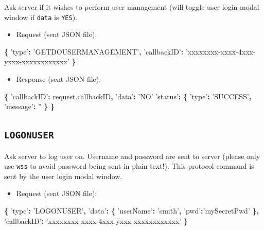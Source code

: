 \documentclass[]{book}
\newenvironment{Shaded}{\begin{snugshade}}{\end{snugshade}}
\newcommand{\AttributeTok}[1]{\textcolor[rgb]{0.77,0.63,0.00}{#1}}
\newcommand{\NormalTok}[1]{#1}
\newcommand{\OperatorTok}[1]{\textcolor[rgb]{0.81,0.36,0.00}{\textbf{#1}}}
\newcommand{\StringTok}[1]{\textcolor[rgb]{0.31,0.60,0.02}{#1}}
\newcommand{\VariableTok}[1]{\textcolor[rgb]{0.00,0.00,0.00}{#1}}
\providecommand{\tightlist}{%
  \setlength{\itemsep}{0pt}\setlength{\parskip}{0pt}}
\theoremstyle{definition}
\theoremstyle{definition}
\theoremstyle{definition}
\theoremstyle{remark}
\begin{document}
Ask server if it wishes to perform user management (will toggle user
login modal window if \texttt{data} is \texttt{YES}).

\begin{itemize}
\tightlist
\item
  Request (sent JSON file):
\end{itemize}

\begin{Shaded}
\begin{Highlighting}[]
\OperatorTok{\{}
  \StringTok{'type'}\OperatorTok{:} \StringTok{'GETDOUSERMANAGEMENT'}\OperatorTok{,}
  \StringTok{'callbackID'}\OperatorTok{:} \StringTok{'xxxxxxxx-xxxx-4xxx-yxxx-xxxxxxxxxxxx'}
\OperatorTok{\}}
\end{Highlighting}
\end{Shaded}

\begin{itemize}
\tightlist
\item
  Response (sent JSON file):
\end{itemize}

\begin{Shaded}
\begin{Highlighting}[]
\OperatorTok{\{}
  \StringTok{'callbackID'}\OperatorTok{:} \VariableTok{request}\NormalTok{.}\AttributeTok{callbackID}\OperatorTok{,}
  \StringTok{'data'}\OperatorTok{:} \StringTok{'NO'}
  \StringTok{'status'}\OperatorTok{:} \OperatorTok{\{}
    \StringTok{'type'}\OperatorTok{:} \StringTok{'SUCCESS'}\OperatorTok{,}
    \StringTok{'message'}\OperatorTok{:} \StringTok{''}
  \OperatorTok{\}}
\OperatorTok{\}}
\end{Highlighting}
\end{Shaded}

\hypertarget{logonuser}{%
\subsection{\texorpdfstring{\texttt{LOGONUSER}}{LOGONUSER}}\label{logonuser}}

Ask server to log user on. Username and password are sent to server
(please only use \texttt{wss} to avoid password being sent in plain
text!). This protocol command is sent by the user login modal window.

\begin{itemize}
\tightlist
\item
  Request (sent JSON file):
\end{itemize}

\begin{Shaded}
\begin{Highlighting}[]
\OperatorTok{\{}
  \StringTok{'type'}\OperatorTok{:} \StringTok{'LOGONUSER'}\OperatorTok{,}
  \StringTok{'data'}\OperatorTok{:} \OperatorTok{\{}
    \StringTok{'userName'}\OperatorTok{:} \StringTok{'smith'}\OperatorTok{,}
    \StringTok{'pwd'}\OperatorTok{:}\StringTok{'mySecretPwd'}
  \OperatorTok{\},}
  \StringTok{'callbackID'}\OperatorTok{:} \StringTok{'xxxxxxxx-xxxx-4xxx-yxxx-xxxxxxxxxxxx'}
\OperatorTok{\}}
\end{Highlighting}
\end{Shaded}
\end{document}
